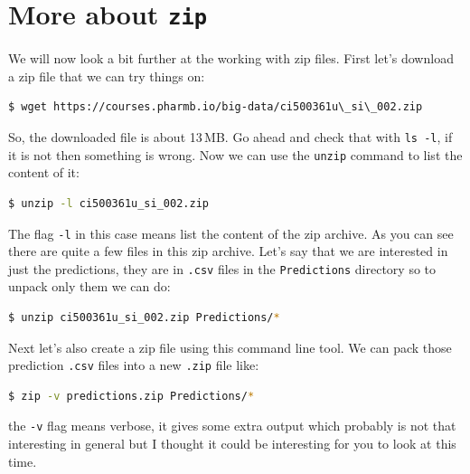 \documentclass[watermark]{pbpreprint}
\begin{document}
\section{More about \texttt{zip}}
We will now look a bit further at the working with zip files. First let's
download a zip file that we can try things on:
%
\begin{lstlisting}[language=bash,escapechar={|},basicstyle=\ttfamily\footnotesize,breaklines=true,
           postbreak=\mbox{\textcolor{red}{$\nicearrow$}\space}]
$ wget https://courses.pharmb.io/big-data/ci500361u\_si\_002.zip
\end{lstlisting}
So, the downloaded file is about 13\,MB. Go ahead and check that with
\texttt{ls -l}, if it is not then something is wrong. 
Now we can use the \texttt{unzip} command to list the content of it:
%
\begin{lstlisting}[language=bash,escapechar={|},basicstyle=\ttfamily\footnotesize]
$ unzip -l ci500361u_si_002.zip
\end{lstlisting}
The flag \texttt{-l} in this case means list the content of the zip archive. As you can
see there are quite a few files in this zip archive. Let's say that we are
interested in just the predictions, they are in \texttt{.csv} files in the
\texttt{Predictions} directory so to unpack only them we can do:
%
\begin{lstlisting}[language=bash,escapechar={|},basicstyle=\ttfamily\footnotesize]
$ unzip ci500361u_si_002.zip Predictions/*
\end{lstlisting}
Next let's also create a zip file using this command line tool. We can pack
those prediction \texttt{.csv} files into a new \texttt{.zip} file like:
%
\begin{lstlisting}[language=bash,escapechar={|},basicstyle=\ttfamily\footnotesize]
$ zip -v predictions.zip Predictions/* 
\end{lstlisting}
the \texttt{-v} flag means verbose, it gives some extra output which probably
is not that interesting in general but I thought it could be interesting
for you to look at this time. 
\end{document}
